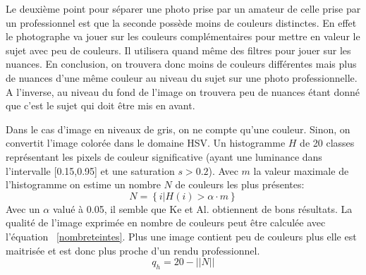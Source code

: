 \documentclass[11pt, french]{report-rd-info}
\begin{document}
\begin{description}
Le deuxième point pour séparer une photo prise par un amateur de celle prise par un professionnel est que la seconde possède moins de couleurs distinctes. En effet le photographe va jouer sur les couleurs complémentaires pour mettre en valeur le sujet avec peu de couleurs. Il utilisera quand même des filtres pour jouer sur les nuances. En conclusion, on trouvera donc moins de couleurs différentes mais plus de nuances d’une même couleur au niveau du sujet sur une photo professionnelle. A l’inverse, au niveau du fond de l’image on trouvera peu de nuances étant donné que c’est le sujet qui doit être mis en avant.

Dans le cas d'image en niveaux de gris, on ne compte qu'une couleur. Sinon, on convertit l'image colorée dans le domaine HSV. Un histogramme $H$ de 20 classes représentant les pixels de couleur significative (ayant une luminance dans l'intervalle [0.15,0.95] et une saturation $s > 0.2$). Avec $m$ la valeur maximale de l'histogramme on estime un nombre $N$ de couleurs les plus présentes: 
\begin{equation}
N = \left\{i|H(i)>\alpha \cdot m\right\}
\end{equation}
Avec un $\alpha$ valué à 0.05, il semble que Ke et Al. obtiennent de bons résultats. La qualité de l'image exprimée en nombre de couleurs peut être calculée avec l'équation ~\ref{nombreteintes}. Plus une image contient peu de couleurs plus elle est maitrisée et est donc plus proche d'un rendu professionnel. 
\begin{equation}
q_h = 20 - ||N||
\label{nombreteintes}
\end{equation}


\end{description}
\end{document}
